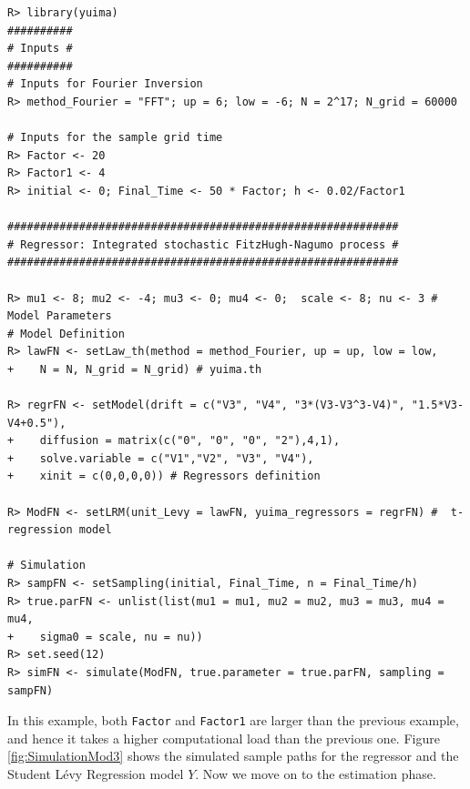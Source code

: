 \begin{verbatim}
R> library(yuima)
##########
# Inputs #
##########
# Inputs for Fourier Inversion
R> method_Fourier = "FFT"; up = 6; low = -6; N = 2^17; N_grid = 60000

# Inputs for the sample grid time
R> Factor <- 20
R> Factor1 <- 4
R> initial <- 0; Final_Time <- 50 * Factor; h <- 0.02/Factor1

############################################################
# Regressor: Integrated stochastic FitzHugh-Nagumo process #
############################################################

R> mu1 <- 8; mu2 <- -4; mu3 <- 0; mu4 <- 0;  scale <- 8; nu <- 3 # Model Parameters
# Model Definition
R> lawFN <- setLaw_th(method = method_Fourier, up = up, low = low,
+    N = N, N_grid = N_grid) # yuima.th

R> regrFN <- setModel(drift = c("V3", "V4", "3*(V3-V3^3-V4)", "1.5*V3-V4+0.5"),
+    diffusion = matrix(c("0", "0", "0", "2"),4,1),
+    solve.variable = c("V1","V2", "V3", "V4"),
+    xinit = c(0,0,0,0)) # Regressors definition

R> ModFN <- setLRM(unit_Levy = lawFN, yuima_regressors = regrFN) #  t-regression model

# Simulation
R> sampFN <- setSampling(initial, Final_Time, n = Final_Time/h)
R> true.parFN <- unlist(list(mu1 = mu1, mu2 = mu2, mu3 = mu3, mu4 = mu4,
+    sigma0 = scale, nu = nu))
R> set.seed(12)
R> simFN <- simulate(ModFN, true.parameter = true.parFN, sampling = sampFN)
\end{verbatim}

In this example, both \texttt{Factor} and \texttt{Factor1} are larger than the previous example, and hence it takes a higher computational load than the previous one.
Figure \ref{fig:SimulationMod3} shows the simulated sample paths for the regressor and the Student Lévy Regression model \(Y\).
Now we move on to the estimation phase.

